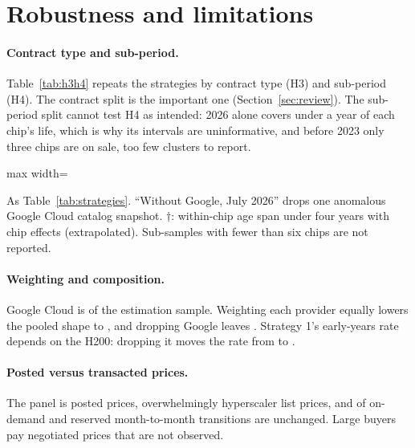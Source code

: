 \section{Robustness and limitations}
\label{sec:robust}

\paragraph{Contract type and sub-period.} Table~\ref{tab:h3h4} repeats the strategies by contract
type (H3) and sub-period (H4). The contract split is the important one (Section~\ref{sec:review}).
The sub-period split cannot test H4 as intended: 2026 alone covers under a year of each chip's
life, which is why its intervals are uninformative, and before 2023 only three chips are on sale,
too few clusters to report.

\begin{table}[htbp]
\centering
\caption{Age profile by contract type and sub-period}
\label{tab:h3h4}
\begin{adjustbox}{max width=\textwidth}

\end{adjustbox}
\par\smallskip\footnotesize As Table~\ref{tab:strategies}. ``Without Google, July 2026'' drops one
anomalous Google Cloud catalog snapshot. $\dagger$: within-chip age span under
four years with chip effects (extrapolated). Sub-samples with fewer than six chips are not reported.
\end{table}

\paragraph{Weighting and composition.} Google Cloud is \nGoogleShare{} of the estimation sample.
Weighting each provider equally lowers the pooled shape to \nShapeEqualProv, and dropping Google
leaves \nShapeNoGoogle. Strategy 1's early-years rate depends on the H200: dropping it moves the
rate from \nOneARateEarly{} to \nOneARateEarlyNoHTwoHundred.

\paragraph{Posted versus transacted prices.} The panel is posted prices, overwhelmingly hyperscaler
list prices, and \nListUnchanged{} of on-demand and reserved month-to-month transitions are
unchanged. Large buyers pay negotiated prices that are not observed. 


